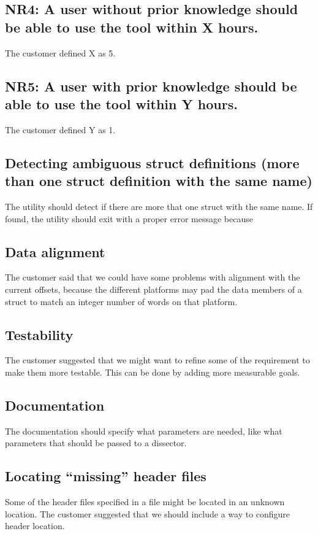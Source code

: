 \subsection*{NR4: A user without prior knowledge should be able to use the tool within X hours.}
The customer defined X as 5.

\subsection*{NR5: A user with prior knowledge should be able to use the tool within Y hours.}
The customer defined Y as 1.

\subsection*{Detecting ambiguous struct definitions (more than one struct definition with the same name)}
The utility should detect if there are more that one struct with the same name. If found, the utility should exit with a proper error message because 

\subsection*{Data alignment}
The customer said that we could have some problems with alignment with the current offsets, because the different platforms may pad the data members of a struct to match an integer number of words on that platform.

\subsection*{Testability}
The customer suggested that we might want to refine some of the requirement to make them more testable. This can be done by adding more measurable goals.

\subsection*{Documentation}
The documentation should specify what parameters are needed, like what parameters that should be passed to a dissector.

\subsection*{Locating “missing” header files}
Some of the header files specified in a file might be located in an unknown location. The customer suggested that we should include a way to configure header location.

